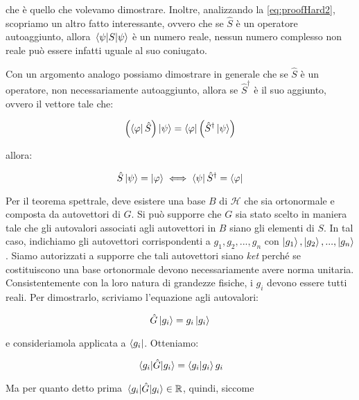 che \`e quello che volevamo dimostrare. Inoltre, analizzando la \eqref{eq:proofHard2}, scopriamo un altro fatto interessante, ovvero che se $\hat{S}$ \`e un operatore autoaggiunto, allora $\mel{\psi}{S}{\psi}$ \`e un numero reale, nessun numero complesso non reale può essere infatti uguale al suo coniugato.

Con un argomento analogo possiamo dimostrare in generale che se $\hat{S}$ \`e un operatore, non necessariamente autoaggiunto, allora se $\hat{S} ^ \dagger$ \`e il suo aggiunto, ovvero il vettore tale che:
    
	\begin{equation}
        	\left ( \bra{\varphi} \hat{S} \right ) \ket{\psi} =
        	\bra{\varphi} \left ( \hat{S}^\dagger \ket{\psi} \right ) 
	\end{equation}

allora:
    
    \begin{equation} \label{eq:proofHardAlt}
        \hat{S} \ket{\psi} = \ket{\varphi} \iff \bra{\psi} \hat{S}^\dagger = \bra{\varphi}
    \end{equation}

Per il teorema spettrale, deve esistere una base $B$ di $\mathcal{H}$ che sia ortonormale e composta da autovettori di $G$. Si può supporre che $G$ sia stato scelto in maniera tale che gli autovalori associati agli autovettori in $B$ siano gli elementi di $S$.
In tal caso, indichiamo gli autovettori corrispondenti a $g_1, g_2, ..., g_n$ con $\ket{g_1}, \ket{g_2}, ..., \ket{g_n}$. Siamo autorizzati a supporre che tali autovettori siano \textit{ket} perché se costituiscono una base ortonormale devono necessariamente avere norma unitaria. \\
Consistentemente con la loro natura di grandezze fisiche, i $g_i$ devono essere tutti reali. Per dimostrarlo, scriviamo l'equazione agli autovalori:

    \begin{equation} \label{eq:realEigenvaluesProof0}
        \hat{G} \ket{g_i} = g_i \ket{g_i}
    \end{equation}
    
e consideriamola applicata a $\bra{g_i}$. Otteniamo:

    \begin{equation}
        \mel{g_i}{\hat{G}}{g_i} = \braket{g_i}{g_i}g_i
    \end{equation}
    
Ma per quanto detto prima $\mel{g_i}{\hat{G}}{g_i} \in \mathbb{R}$, quindi, siccome


